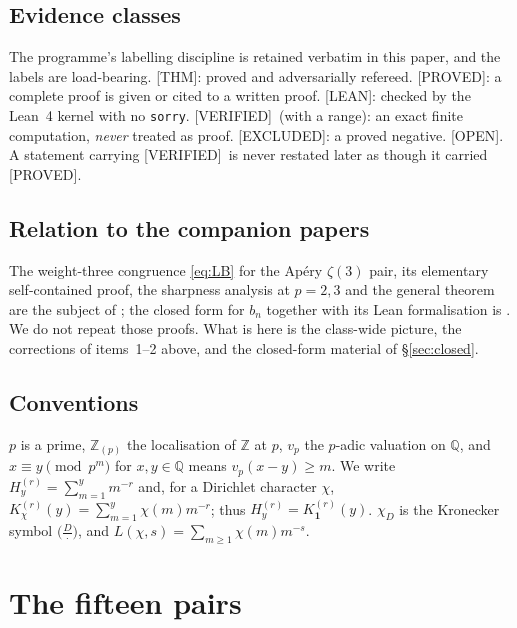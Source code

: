 \documentclass[11pt,reqno]{amsart}
\theoremstyle{plain}
\theoremstyle{definition}
\theoremstyle{remark}
\newcommand{\Z}{\mathbb{Z}}
\newcommand{\Q}{\mathbb{Q}}
\newcommand{\Zp}{\Z_{(p)}}
\newcommand{\vp}{v_p}
\newcommand{\HH}[2]{H^{(#1)}_{#2}}
\newcommand{\KK}[3]{K^{(#1)}_{#2}\!\left(#3\right)}
\newcommand{\Thm}{\textup{\textsf{[THM]}}}
\newcommand{\Proved}{\textup{\textsf{[PROVED]}}}
\newcommand{\Lean}{\textup{\textsf{[LEAN]}}}
\newcommand{\Verified}{\textup{\textsf{[VERIFIED]}}}
\newcommand{\Excluded}{\textup{\textsf{[EXCLUDED]}}}
\newcommand{\Open}{\textup{\textsf{[OPEN]}}}
\numberwithin{equation}{section}
\begin{document}
\subsection{Evidence classes}\label{sec:labels}
The programme's labelling discipline is retained verbatim in this paper, and the labels are
load-bearing. \Thm: proved and adversarially refereed. \Proved: a complete proof is given
or cited to a written proof. \Lean: checked by the Lean~4 kernel with no \texttt{sorry}.
\Verified\ (with a range): an exact finite computation, \emph{never} treated as proof.
\Excluded: a proved negative. \Open. A statement carrying \Verified\ is never restated
later as though it carried \Proved.

\subsection{Relation to the companion papers}
The weight-three congruence \eqref{eq:LB} for the Ap\'ery $\zeta(3)$ pair, its elementary
self-contained proof, the sharpness analysis at $p=2,3$ and the general theorem are the
subject of \cite{CompanionLucas2nd}; the closed form for $b_n$ together with its Lean
formalisation is \cite{CompanionLucasMin}. We do not repeat those proofs. What is here is
the class-wide picture, the corrections of items~1--2 above, and the closed-form material
of \S\ref{sec:closed}.

\subsection{Conventions}
$p$ is a prime, $\Zp$ the localisation of $\Z$ at $p$, $\vp$ the $p$-adic valuation on
$\Q$, and $x\equiv y\pmod{p^m}$ for $x,y\in\Q$ means $\vp(x-y)\ge m$. We write
$\HH ry=\sum_{m=1}^y m^{-r}$ and, for a Dirichlet character $\chi$,
$\KK r\chi y=\sum_{m=1}^{y}\chi(m)m^{-r}$; thus $\HH ry=\KK r{\mathbf 1}y$. $\chi_D$ is the
Kronecker symbol $\bigl(\tfrac D\cdot\bigr)$, and $L(\chi,s)=\sum_{m\ge1}\chi(m)m^{-s}$.

\section{The fifteen pairs}\label{sec:pairs}
\end{document}
